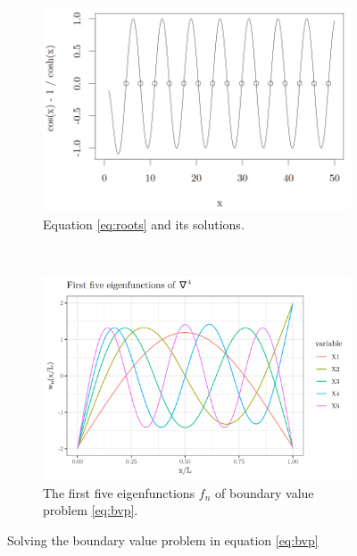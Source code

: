 \begin{figure}[tbhp]
    \centering
    \begin{subfigure}[b]{0.48\textwidth}
        \centering
        \includegraphics[width=\textwidth]{eq_roots.png}
        \caption{Equation \ref{eq:roots} and its solutions.}
        \label{subfig:roots}
    \end{subfigure}
    ~
    \begin{subfigure}[b]{0.48\textwidth}
        \centering
        \includegraphics[width=\textwidth]{efuncs.png}
        \caption{The first five eigenfunctions $f_n$ of boundary value problem \ref{eq:bvp}.}
        \label{subfig:efuncs}
    \end{subfigure}
    \caption[Solutions to the biharmonic equation for a one-dimensional filament model]{Solving the boundary value problem in equation \ref{eq:bvp}}
    \label{fig:bvp_sol}
\end{figure}

